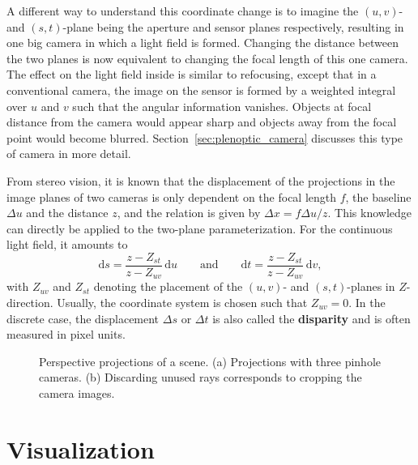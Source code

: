 A different way to understand this coordinate change is to imagine the $(u, v)$- and $(s, t)$-plane being the aperture and sensor planes respectively, resulting in one big camera in which a light field is formed.
Changing the distance between the two planes is now equivalent to changing the focal length of this one camera.
The effect on the light field inside is similar to refocusing, except that in a conventional camera, the image on the sensor is formed by a weighted integral over $u$ and $v$ such that the angular information vanishes.
Objects at focal distance from the camera would appear sharp and objects away from the focal point would become blurred.
Section~\ref{sec:plenoptic_camera} discusses this type of camera in more detail.

From stereo vision, it is known that the displacement of the projections in the image planes of two cameras is only dependent on the focal length $f$, the baseline $\Delta u$ and the distance $z$, and the relation is given by $\Delta x = f \Delta u / z$.
This knowledge can directly be applied to the two-plane parameterization. 
For the continuous light field, it amounts to
\begin{equation}\label{eq:disparity_for_two_plane_parameterization}
	\textrm{d}s = \frac{z - Z_{st}}{z - Z_{uv}} \, \textrm{d}u 
	\qquad
	\text{and} 
	\qquad
	\textrm{d}t = \frac{z - Z_{st}}{z - Z_{uv}} \, \textrm{d}v,
\end{equation}
with $Z_{uv}$ and $Z_{st}$ denoting the placement of the $(u, v)$- and \mbox{$(s, t)$-planes} in \mbox{$Z$-direction}.
Usually, the coordinate system is chosen such that $Z_{uv} = 0$.
In the discrete case, the displacement $\Delta s$ or $\Delta t$ is also called the \textbf{disparity} and is often measured in pixel units.

\begin{figure}[tb]
	\subcaptionbox{\label{fig:ShiftedPerspectiveProjection}}{}\hfill%
	\subcaptionbox{\label{fig:RectifiedPerspectiveProjection}}{}
	\caption[Parameterization for light fields from perspective projections]
			{Perspective projections of a scene. 
			 (a) Projections with three pinhole cameras. 
			 (b) Discarding unused rays corresponds to cropping the camera images.}
\end{figure}

\section{Visualization}
\label{sec:Visualization}

